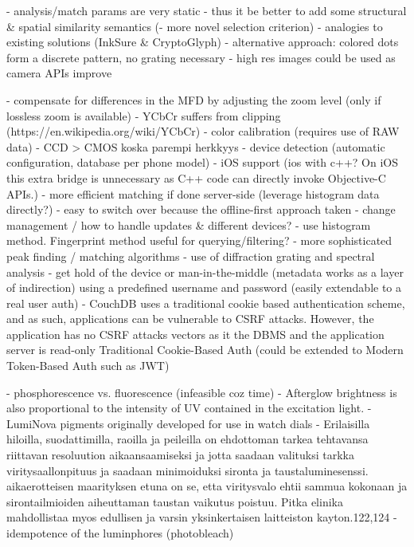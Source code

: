 \documentclass[thesis.tex]{subfiles}
\begin{document}
- analysis/match params are very static
- thus it be better to add some structural \& spatial similarity semantics (- more novel selection criterion) - analogies to existing solutions (InkSure \& CryptoGlyph)
  - alternative approach: colored dots form a discrete pattern, no grating necessary
- high res images could be used as camera APIs improve

- compensate for differences in the MFD by adjusting the zoom level (only if lossless zoom is available)
- YCbCr suffers from clipping (https://en.wikipedia.org/wiki/YCbCr)
- color calibration (requires use of RAW data)
  - CCD > CMOS koska parempi herkkyys
- device detection (automatic configuration, database per phone model)
- iOS support (ios with c++? On iOS this extra bridge is unnecessary as C++ code can directly invoke Objective-C APIs.)
- more efficient matching if done server-side (leverage histogram data directly?)
  - easy to switch over because the offline-first approach taken
- change management / how to handle updates \& different devices?
- use histogram method. Fingerprint method useful for querying/filtering?
- more sophisticated peak finding / matching algorithms
- use of diffraction grating and spectral analysis
- get hold of the device or man-in-the-middle (metadata works as a layer of indirection)
using a predefined username and password (easily extendable to a real user auth)
- CouchDB uses a traditional cookie based authentication scheme, and as such, applications can be vulnerable to CSRF attacks. However, the application has no CSRF attacks vectors as it the DBMS and the application server is read-only
Traditional Cookie-Based Auth (could be extended to Modern Token-Based Auth such as JWT)

- phosphorescence vs. fluorescence (infeasible coz time)
- Afterglow brightness is also proportional to the intensity of UV contained in the excitation light.
- LumiNova pigments originally developed for use in watch dials
- Erilaisilla hiloilla, suodattimilla, raoilla ja peileilla on ehdottoman tarkea tehtavansa riittavan resoluution aikaansaamiseksi ja jotta saadaan valituksi tarkka viritysaallonpituus ja saadaan minimoiduksi sironta ja taustaluminesenssi. aikaerotteisen maarityksen etuna on se, etta viritysvalo ehtii sammua kokonaan ja sirontailmioiden aiheuttaman taustan vaikutus poistuu. Pitka elinika mahdollistaa myos edullisen ja varsin yksinkertaisen laitteiston kayton.122,124
- idempotence of the luminphores (photobleach)
\end{document}
